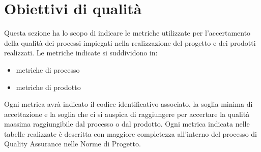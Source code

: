 \section{Obiettivi di qualità}
\label{sec:obiettivi_qualità}
Questa sezione ha lo scopo di indicare le metriche utilizzate per l'accertamento della qualità dei processi impiegati nella realizzazione
del progetto e dei prodotti realizzati.
Le metriche indicate si suddividono in:
\begin{itemize}
    \item metriche di processo
    \item metriche di prodotto
\end{itemize} 
Ogni metrica avrà indicato il codice identificativo associato, la soglia minima di accettazione e la soglia che ci si auspica di raggiungere 
per accertare la qualità massima raggiungibile dal processo o dal prodotto.
Ogni metrica indicata nelle tabelle realizzate è descritta con maggiore completezza all'interno del processo di Quality Assurance nelle Norme di Progetto.




